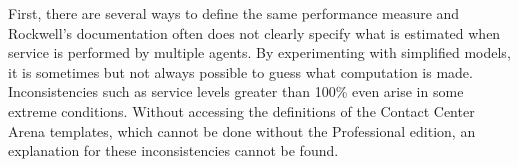 First, there are several ways
to define the same performance measure and Rockwell's documentation
often does not clearly specify what is estimated when service is
performed by multiple agents.  By
experimenting with simplified models, it is sometimes but not always
possible to guess what computation is made.
Inconsistencies such as service levels greater than 100\%
 even arise in some extreme conditions.
Without accessing the definitions of the Contact Center Arena
templates, which cannot be done without the Professional edition, an
explanation for these inconsistencies cannot be found.



\begin{comment}
\subsection{Different results from Arena Contact Center Edition}

We can see from the statistical report on Listing~\ref{res:Teamwork}
that our results are different
from Arena Contact Center Edition~8.0's.  This is due to several
factors and possible bugs in Arena Contact Center Edition arising when
contacts are served by several agents sequentially.

First, there are several ways
to define the same performance measure and Rockwell's documentation
often does not clearly specify what is estimated when service is
performed by multiple agents.  By
experimenting with simplified models, it is sometimes but not always
possible to guess what computation is made.
Inconsistencies such as service levels greater than 100\%
 even arise in some extreme conditions.
Without accessing the definitions of the Contact Center Arena
templates, which cannot be done without the Professional edition, an
explanation for these inconsistencies cannot be found.

Our first simplified model we will call $MM$
disables conferencing and sends every contact
to the manager after they are served by the receptionist.  This way,
the model becomes similar to preceding
examples, except that the service is performed by two agents
sequentially.
By simulating 10 replications in Arena Contact Center Edition, we
obtain a speed of
answer of $1.54\pm 0.03$.  If, as with the code of this example,
the average speed of answer is computed
using the cumulative queue time for contacts served by the manager
after being served by the receptionist only,
the Java program gives $3.30\pm 0.08$, which
is significantly higher than Arena Contact Center Edition.  If the
performance measure is computed by
summing the waiting times at the receptionist only for contacts served
by the manager, we obtain
$1.66\pm 0.05$, which is better but still significantly different from
Arena Contact Center Edition.


\end{comment}
